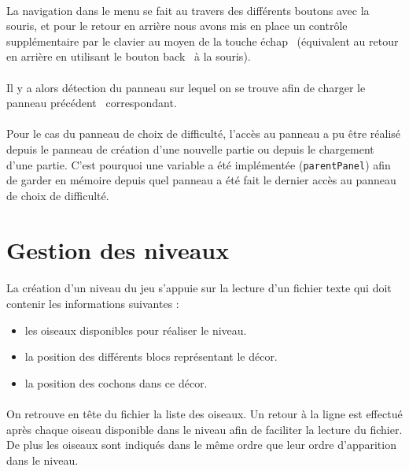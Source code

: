 \documentclass[a4paper,12pt]{report}
\begin{document}
\paragraph{}La navigation dans le menu se fait au travers des différents boutons avec la souris, et pour le retour en arrière nous avons mis en place un contrôle supplémentaire par le clavier au moyen de la touche \guillemotleft échap\guillemotright~ (équivalent au retour en arrière en utilisant le bouton \guillemotleft back\guillemotright~ à la souris).
\paragraph{}Il y a alors détection du panneau sur lequel on se trouve afin de charger le panneau \guillemotleft précédent\guillemotright~ correspondant. 
\paragraph{}Pour le cas du panneau de choix de difficulté, l’accès au panneau a pu être réalisé depuis le panneau de création d’une nouvelle partie ou depuis le chargement d’une partie. C’est pourquoi une variable a été implémentée (\verb+parentPanel+) afin de garder en mémoire depuis quel panneau a été fait le dernier accès au panneau de choix de difficulté.


\section{Gestion des niveaux}
\paragraph{}La création d’un niveau du jeu s’appuie sur la lecture d’un fichier texte qui doit contenir les informations suivantes :
\begin{itemize}
\item les oiseaux disponibles pour réaliser le niveau.
\item la position des différents blocs représentant le décor.
\item la position des cochons dans ce décor.
\end{itemize}

\paragraph{}On retrouve en tête du fichier la liste des oiseaux. Un retour à la ligne est effectué après chaque oiseau disponible dans le niveau afin de faciliter la lecture du fichier. De plus les oiseaux sont indiqués dans le même ordre que leur ordre d’apparition dans le niveau.
\end{document}
